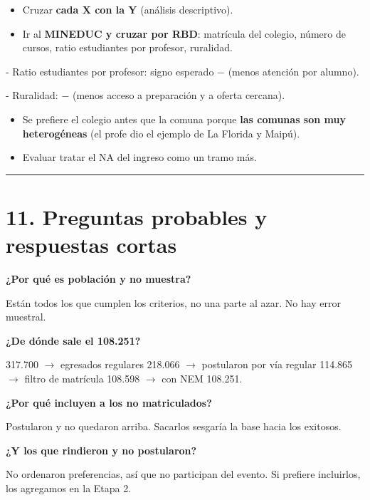 \documentclass[11pt]{article}
\begin{document}
\begin{itemize}
\item Cruzar \textbf{cada X con la Y} (análisis descriptivo).
\item Ir al \textbf{MINEDUC y cruzar por RBD}: matrícula del colegio, número de cursos, ratio estudiantes por profesor, ruralidad.
\end{itemize}
  - Ratio estudiantes por profesor: signo esperado \textbf{$-$} (menos atención por alumno).\par
  - Ruralidad: \textbf{$-$} (menos acceso a preparación y a oferta cercana).\par
\begin{itemize}
\item Se prefiere el colegio antes que la comuna porque \textbf{las comunas son muy heterogéneas} (el profe dio el ejemplo de La Florida y Maipú).
\item Evaluar tratar el NA del ingreso como un tramo más.
\end{itemize}

\medskip\hrule\medskip

\section*{11. Preguntas probables y respuestas cortas}

\textbf{¿Por qué es población y no muestra?}\par
\begin{guion}Están todos los que cumplen los criterios, no una parte al azar. No hay error muestral.\end{guion}

\textbf{¿De dónde sale el 108.251?}\par
\begin{guion}317.700 $\rightarrow$ egresados regulares 218.066 $\rightarrow$ postularon por vía regular 114.865 $\rightarrow$ filtro de matrícula 108.598 $\rightarrow$ con NEM 108.251.\end{guion}

\textbf{¿Por qué incluyen a los no matriculados?}\par
\begin{guion}Postularon y no quedaron arriba. Sacarlos sesgaría la base hacia los exitosos.\end{guion}

\textbf{¿Y los que rindieron y no postularon?}\par
\begin{guion}No ordenaron preferencias, así que no participan del evento. Si prefiere incluirlos, los agregamos en la Etapa 2.\end{guion}
\end{document}
